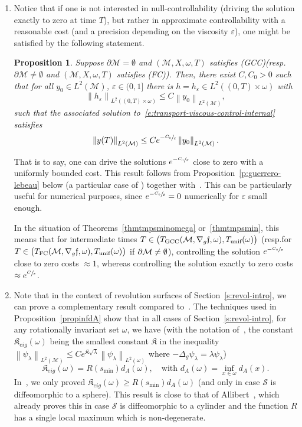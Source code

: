 \documentclass[10pt]{amsart}
\newcommand{\FC}{\textup{FC}}
\newcommand{\pFC}{\textup{(FC)}\xspace}
\newcommand{\GCC}{\textup{GCC}}
\newcommand{\pGCC}{\textup{(GCC)}\xspace}
\newcommand{\unif}{\textup{unif}}
\newtheorem{proposition}[lemma]{Proposition}
\theoremstyle{definition}
\newcommand{\M}{\ensuremath{\mathcal M}}
\newcommand{\calS}{\ensuremath{\mathcal S}}
\newcommand{\f}{\ensuremath{\mathfrak{f}}}
\newcommand\nor[2]{\left\|#1\right\|_{#2}}
\let\d\partial
\let\e\varepsilon
\let\eps\varepsilon
\providecommand{\resp}{resp.}\providecommand{\cf}{cf.}
\begin{document}
\begin{enumerate}
\item Notice that if one is not interested in null-controllability (\ie driving the solution exactly to zero at time $T$), but rather in approximate controllability with a reasonable cost (and a precision depending on the viscosity $\eps$), one might be satisfied by the following statement.
\begin{proposition}
\label{p:guerrero-lebeau-control}
Suppose $\d\M= \emptyset$ and $(\M, X,\omega,T)$ satisfies \pGCC (resp.\ $\d\M \neq \emptyset$ and $(\M, X,\omega,T)$ satisfies \pFC). Then, there exist $C,C_0>0$ such that for all $y_0\in L^2(\M)$, $\eps \in (0,1]$ there is $h=h_\eps \in L^2((0,T)\times \omega)$ with
\[
\nor{h_\eps}{L^2((0,T)\times \omega)} \leq C \nor{y_0}{L^2(\M)},
\]
such that the associated solution to~\eqref{e:transport-viscous-control-internal} satisfies
\[
\nor{y(T)}{L^2(\M)} \leq Ce^{-\sfrac{C_{0}}{\e}} \nor{y_0}{L^2(\M)}.
\]
\end{proposition}
That is to say, one can drive the solutions $e^{-\sfrac{C_{0}}{\e}} $ close to zero with a uniformly bounded cost.
This result follows from Proposition~\ref{p:guerrero-lebeau} below (a particular case of \cite[Prop.\,3]{GL:07}) together with~\cite[App.]{LL:17approx}.
This can be particularly useful for numerical purposes, since $e^{-\sfrac{C_{0}}{\e}} = 0$ numerically for $\eps$ small enough.

In the situation of Theorems~\ref{thmtmpsminomega} or~\ref{thmtmpsmin}, this means that for intermediate times $T \in\nobreak \big(T_{\GCC}(\M, \nabla_g\f,\omega), T_{\unif}(\omega) \big)$ (\resp for $T \in \big(T_{\FC}(\M, \nabla_g\f,\omega), T_{\unif}(\omega) \big)$ if $\d\M \neq\nobreak \emptyset$), controlling the solution $e^{-\sfrac{C_{0}}{\e}}$ close to zero costs $\approx 1$, whereas controlling the solution exactly to zero costs $\approx e^{\sfrac{C}{\eps}}$.

\item Note that in the context of revolution surfaces of Section~\ref{s:revol-intro}, we can prove a complementary result compared to~\cite[Th.\,1.9/Cor.\,1.10]{LL:18}. The techniques used in Proposition~\ref{propinfdA} show that in all cases of Section~\ref{s:revol-intro}, for any rotationally invariant set $\omega$, we have (with the notation of~\cite{LL:18}, the constant $\mathfrak{K}_{eig}(\omega)$ being the smallest constant $\mathfrak{K}$ in the inequality $\nor{\psi_\lambda}{L^2(\M)} \leq Ce^{\mathfrak{K}\sqrt{\lambda}}\nor{\psi_\lambda}{L^2(\omega)}$ where $-\Delta_g \psi_\lambda = \lambda \psi_\lambda$)
\[
\mathfrak{K}_{eig}(\omega) = R(s_{\min}) d_A(\omega), \quad \text{with } d_A(\omega) = \inf_{x\in \omega} d_A(x).
\]
In~\cite{LL:18}, we only proved $\mathfrak{K}_{eig}(\omega) \geq R(s_{\min}) d_A(\omega)$ (and only in case $\calS$ is diffeomorphic to a sphere). This result is close to that of Allibert~\cite{Allibert:98}, which already proves this in case $\calS$ is diffeomorphic to a cylinder and the function $R$ has a single local maximum which is non-degenerate.
\end{enumerate}
\end{document}

